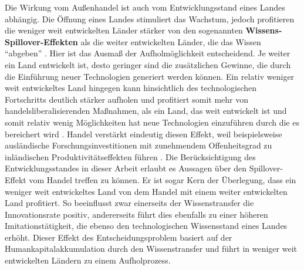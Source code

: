Die Wirkung vom Au{\ss}enhandel ist auch vom Entwicklungsstand eines Landes abh{\"a}ngig. Die {\"O}ffnung eines Landes stimuliert das Wachstum, jedoch profitieren die weniger weit entwickelten L{\"a}nder st{\"a}rker von den sogenannten \textbf{Wissens-Spillover-Effekten} als die weiter entwickelten L{\"a}nder, die das Wissen "`abgeben"' \citep{Sachs.1995,Grossman.1990b}. Hier ist das Ausma{\ss} der Aufholm{\"o}glichkeit entscheidend. Je weiter ein Land entwickelt ist, desto geringer sind die zus{\"a}tzlichen Gewinne, die durch die Einf{\"u}hrung neuer Technologien generiert werden k{\"o}nnen. Ein relativ weniger weit entwickeltes Land hingegen kann hinsichtlich des technologischen Fortschritts deutlich st{\"a}rker aufholen und profitiert somit mehr von handelsliberalisierenden Ma{\ss}nahmen, als  ein Land, das weit entwickelt ist und somit relativ wenig M{\"o}glichkeiten hat neue Technologien einzuf{\"u}hren durch die es bereichert wird \citep{Keller.2004}. Handel verst{\"a}rkt eindeutig diesen Effekt, weil beispielsweise ausl{\"a}ndische Forschungsinvestitionen mit zunehmendem Offenheitsgrad zu inl{\"a}ndischen Produktivit{\"a}tseffekten f{\"u}hren \citep{Coe.1995}.\newline 
Die Ber{\"u}cksichtigung des Entwicklungsstandes in dieser Arbeit erlaubt es Aussagen {\"u}ber den Spillover-Effekt vom Handel treffen zu k{\"o}nnen. Er ist sogar Kern der {\"U}berlegung, dass ein weniger weit entwickeltes Land von dem Handel mit einem weiter entwickelten Land profitiert. So beeinflusst zwar einerseits der Wissenstransfer die Innovationsrate positiv, andererseits f{\"u}hrt dies ebenfalls zu einer h{\"o}heren Imitationst{\"a}tigkeit, die ebenso den technologischen Wissensstand eines Landes erh{\"o}ht. Dieser Effekt des Entscheidungsproblem basiert auf der Humankapitalakkumulation durch den Wissenstransfer und f{\"u}hrt in weniger weit entwickelten L{\"a}ndern zu einem Aufholprozess.\\



